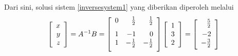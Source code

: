 \begin{solution}
Dari sini, solusi sistem \ref{inversesystem1} yang diberikan
diperoleh melalui
\begin{equation*}
\leftB
\begin{array}{r}
x \\
y \\
z
\end{array}
\rightB = A^{-1}B = \leftB
\begin{array}{rrr}
0 & \vspace{0.05in}\frac{1}{2} & \vspace{0.05in}\frac{1}{2} \\
1 & -1 & 0 \\
1 & -\vspace{0.05in}\frac{1}{2} & -\vspace{0.05in}\frac{1}{2}
\end{array}
\rightB \leftB
\begin{array}{r}
1 \\
3 \\
2
\end{array}
\rightB =\leftB
\begin{array}{r}
\vspace{0.05in}\frac{5}{2} \\
-2 \\
-\vspace{0.05in}\frac{3}{2}
\end{array}
\rightB 
\end{equation*}
\end{solution}

